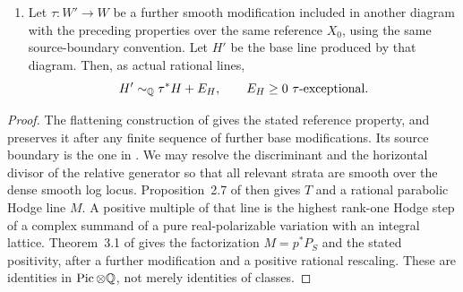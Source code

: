 \begin{lemma}
\begin{enumerate}
\item Let \(\tau:W'\to W\) be a further smooth modification included
in another diagram with the preceding properties over the same reference
\(X_0\), using the same source-boundary convention.  Let \(H'\) be the
base line produced by that diagram.  Then, as actual rational lines,
\begin{equation}
                  H'\sim_{\mathbb Q}\tau^*H+E_H,
 \qquad E_H\geq0\ \text{\(\tau\)-exceptional}.
\label{rank:higher-base}
\end{equation}
\end{enumerate}
\end{lemma}

\begin{proof}
The flattening construction of \cite[Lemma~2.4]{CI} gives the stated
reference property, and preserves it after any finite sequence of
further base modifications.  Its source boundary is the one in
\cite[Lemma~2.1]{CI}.  We may resolve the discriminant and the
horizontal divisor of the relative generator so that all relevant
strata are smooth over the dense smooth log locus.  Proposition~2.7
of \cite{CI} then gives \(T\) and a rational parabolic Hodge line
\(M\).  A positive multiple of that line is the highest rank-one
Hodge step of a complex summand of a pure real-polarizable variation
with an integral lattice.  Theorem~3.1 of \cite{CI} gives the
factorization \(M=p^*P_S\) and the stated positivity, after a further
modification and a positive rational rescaling.  These are identities
in \(\operatorname{Pic}\otimes\mathbb Q\), not merely identities of classes.


\end{proof}
